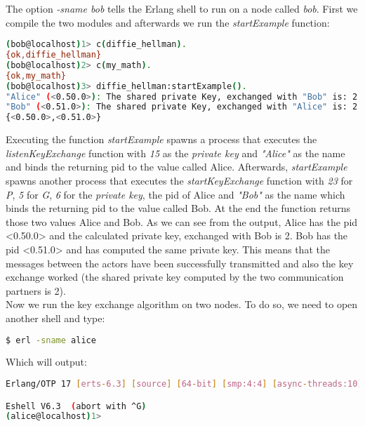 \documentclass[xcolor=dvipsnames]{article}
\begin{document}
\noindent The option \textit{-sname bob} tells the Erlang shell to run on a node called \textit{bob}. First we compile the two modules and afterwards we run the \textit{startExample} function:

\begin{lstlisting}[language=bash, numbers=none]
(bob@localhost)1> c(diffie_hellman).
{ok,diffie_hellman}
(bob@localhost)2> c(my_math).
{ok,my_math}
(bob@localhost)3> diffie_hellman:startExample().
"Alice" (<0.50.0>): The shared private Key, exchanged with "Bob" is: 2
"Bob" (<0.51.0>): The shared private Key, exchanged with "Alice" is: 2
{<0.50.0>,<0.51.0>}
\end{lstlisting}

\noindent Executing the function \textit{startExample} spawns a process that executes the \textit{listenKeyExchange} function with \textit{15} as the \textit{private key} and \textit{"Alice"} as the name and binds the returning \gls{pid} to the value called Alice. Afterwards, \textit{startExample} spawns another process that executes the \textit{startKeyExchange} function with \textit{23} for \textit{P}, \textit{5} for \textit{G}, \textit{6} for the \textit{private key}, the \gls{pid} of Alice and \textit{"Bob"} as the name which binds the returning \gls{pid} to the value called Bob. At the end the function returns those two values Alice and Bob. As we can see from the output, Alice has the \gls{pid} <0.50.0> and the calculated private key, exchanged with Bob is 2. Bob has the \gls{pid} <0.51.0> and has computed the same private key. This means that the messages between the actors have been successfully transmitted and also the key exchange worked (the shared private key computed by the two communication partners is 2).\\

\noindent Now we run the key exchange algorithm on two nodes. To do so, we need to open another shell and type:

\begin{lstlisting}[language=bash, numbers=none]
$ erl -sname alice
\end{lstlisting}

\noindent Which will output:

\begin{lstlisting}[language=bash, numbers=none]
Erlang/OTP 17 [erts-6.3] [source] [64-bit] [smp:4:4] [async-threads:10] [hipe] [kernel-poll:false]

Eshell V6.3  (abort with ^G)
(alice@localhost)1>
\end{lstlisting}
\end{document}
